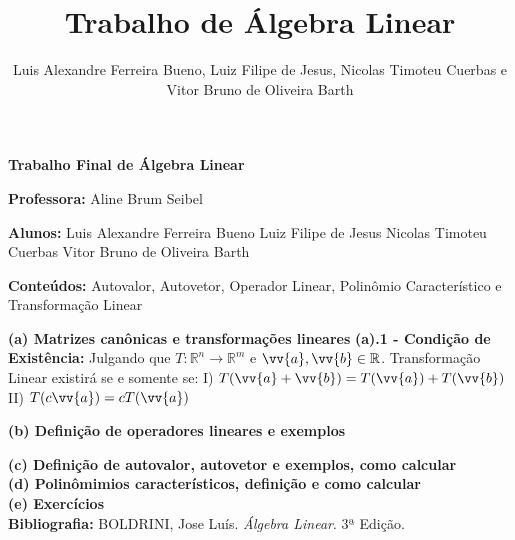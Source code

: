 \documentclass[11pt,a4paper]{article}
\author{Luis Alexandre Ferreira Bueno, Luiz Filipe de Jesus, Nicolas Timoteu Cuerbas e Vitor Bruno de Oliveira Barth}
\title{Trabalho de Álgebra Linear }
\newcommand\tab[1][1.835cm]{\hspace*{#1}}
\begin{document}
\begin{center}
\textbf{Trabalho Final de Álgebra Linear}
\end{center}

\begin{flushleft}

\textbf{Professora: }Aline Brum Seibel\linebreak

\textbf{Alunos: } Luis Alexandre Ferreira Bueno\linebreak 
\tab Luiz Filipe de Jesus\linebreak
\tab Nicolas Timoteu Cuerbas\linebreak
\tab Vitor Bruno de Oliveira Barth\linebreak
	
\textbf{Conteúdos:} Autovalor, Autovetor, Operador Linear, Polinômio Característico e Transformação Linear\linebreak

%
%

\textbf{(a) Matrizes canônicas e transformações lineares}\linebreak
\linebreak
\textbf{(a).1 - Condição de Existência:}\linebreak
Julgando que $T: {\mathbb{R}}^n\rightarrow{\mathbb{R}^m} $ e $\vv{a}, \vv{b} \in {\mathbb{R}}$. Transformação Linear existirá se e somente se: \linebreak
\tab I) $T(\vv{a} + \vv{b}) = T(\vv{a}) + T(\vv{b})$\linebreak
\tab II) $T(c\vv{a}) = cT(\vv{a})$ \linebreak 

\textbf{(b) Definição de operadores lineares e exemplos}\linebreak

\textbf{(c) Definição de autovalor, autovetor e exemplos, como calcular}\linebreak
\\
\textbf{(d) Polinômimios característicos, definição e como calcular}\linebreak
\\
\textbf{(e) Exercícios}\linebreak
\\

%
%

\textbf{Bibliografia: }BOLDRINI, Jose Luís. \textit{Álgebra Linear}. 3ª Edição.
\end{flushleft}
\end{document}
